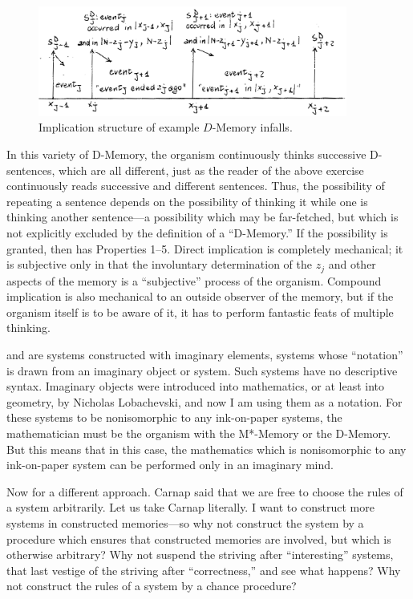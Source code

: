 \begin{figure}
	\centering
	\includegraphics[width=4in]{img/infallsdiag}
	\caption{Implication structure of example $D$-Memory infalls.}
	\label{infallsdiag}
\end{figure}

In this variety of D-Memory, the organism continuously thinks successive 
D-sentences, which are all different, just as the reader of the above exercise 
continuously reads successive and different sentences. Thus, the possibility 
of repeating a sentence depends on the possibility of thinking it while one is 
thinking another sentence---a possibility which may be far-fetched, but which 
is not explicitly excluded by the definition of a \enquote{D-Memory.} If the 
possibility is granted, then  has Properties 1--5. Direct implication is 
completely mechanical; it is subjective only in that the involuntary 
determination of the $z_j$ and other aspects of the memory is a \enquote{subjective}
process of the organism. Compound implication is also mechanical to an 
outside observer of the memory, but if the organism itself is to be aware of 
it, it has to perform fantastic feats of multiple thinking. 

 and  are systems constructed with 
imaginary elements, systems whose \enquote{notation} is drawn from an imaginary 
object or system. Such systems have no descriptive syntax. Imaginary objects 
were introduced into mathematics, or at least into geometry, by Nicholas 
Lobachevski, and now I am using them as a notation. For these systems to 
be nonisomorphic to any ink-on-paper systems, the mathematician must be 
the organism with the M*-Memory or the D-Memory. But this means that 
in this case, the mathematics which is nonisomorphic to any ink-on-paper 
system can be performed only in an imaginary mind. 

Now for a different approach. Carnap said that we are free to choose 
the rules of a system arbitrarily. Let us take Carnap literally. I want to 
construct more systems in constructed memories---so why not construct the 
system by a procedure which ensures that constructed memories are 
involved, but which is otherwise arbitrary? Why not suspend the striving 
after \enquote{interesting} systems, that last vestige of the striving after 
\enquote{correctness,} and see what happens? Why not construct the rules of a 
system by a chance procedure? 

